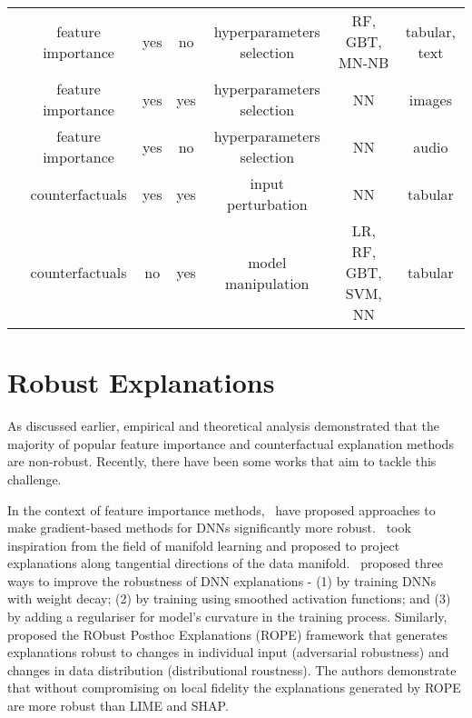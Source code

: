 \documentclass[sigconf]{acmart}
\newcommand{\s}[1]{\textcolor{red}{#1}}
\begin{document}
\begin{table*}
\begin{tabular}{ccccccc}
    \cite{Zhang_arXiv_2019} & feature importance & yes & no & hyperparameters selection & RF, GBT, MN-NB & tabular, text\\
    \cite{Bansal_cvpr_2020} & feature importance & yes & yes & hyperparameters selection & NN & images \\
    \cite{Mishra_ijcnn_2020} & feature importance & yes & no & hyperparameters selection & NN & audio \\
    
    
    
    \cite{slack2021counterfactual} & counterfactuals & yes & yes & input perturbation & NN & tabular\\
    
    \cite{rawal2020can} & counterfactuals & no & yes & model manipulation & LR, RF, GBT, SVM, NN & tabular\\
    
  \bottomrule
\end{tabular}
\end{table*}

\vspace{-2.5 mm}
\section{Robust Explanations}

As discussed earlier, empirical and theoretical analysis demonstrated that the majority of popular feature importance and counterfactual explanation methods are non-robust. Recently, there have been some works that aim to tackle this challenge. %

In the context of feature importance methods,~\cite{Anders_arXiv_2020, Dombrowski_pr_2022} have proposed approaches to make gradient-based methods for DNNs significantly more robust.~\citet{Anders_arXiv_2020} took inspiration from the field of manifold learning and proposed to project explanations along tangential directions of the data manifold.~\citet{Dombrowski_pr_2022} proposed three ways to improve the robustness of DNN explanations - (1) by training DNNs with weight decay; (2) by training using smoothed activation functions; and (3) by adding a regulariser for model's curvature in the training process. Similarly,~\citet{Lakkaraju_icml_2020} proposed the RObust Posthoc Explanations (ROPE) framework that generates explanations robust to changes in individual input (adversarial robustness) and changes in data distribution (distributional roustness). The authors demonstrate that without compromising on local fidelity the explanations generated by ROPE are more robust than LIME and SHAP. 
\end{document}
